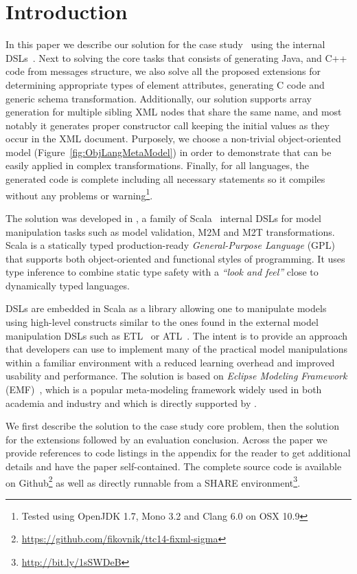 
\enlargethispage{20mm}

\section{Introduction}
\label{sec:Introduction}

In this paper we describe our solution for the \TTC \FIXML case study~\cite{Lano2014} using the \SIGMA internal DSLs~\cite{Krikava2014}.
Next to solving the core tasks that consists of generating Java, \Csharp and C++ code from \FIXML messages structure, we also solve all the proposed extensions for determining appropriate types of element attributes, generating C code and generic \FIXML schema transformation.
Additionally, our solution supports array generation for multiple sibling XML nodes that share the same name, and most notably it generates proper constructor call keeping the initial values as they occur in the XML document.
Purposely, we choose a non-trivial object-oriented model (\Cf Figure~\ref{fig:ObjLangMetaModel}) in order to demonstrate that \SIGMA can be easily applied in complex transformations.
Finally, for all languages, the generated code is complete including all necessary statements so it compiles without any problems or warning\footnote{Tested using OpenJDK 1.7, Mono 3.2 and Clang 6.0 on OSX 10.9}.

The solution was developed in \SIGMA, a family of Scala~\cite{Odersky2004} internal DSLs for model manipulation tasks such as model validation, M2M and M2T transformations.
Scala is a statically typed production-ready \emph{General-Purpose Language} (GPL) that supports both object-oriented and functional styles of programming.
It uses type inference to combine static type safety with a \emph{``look and feel''} close to dynamically typed languages.

\SIGMA DSLs are embedded in Scala as a library allowing one to manipulate models using high-level constructs similar to the ones found in the external model manipulation DSLs such as ETL~\cite{Kolovos2008a} or ATL~\cite{Jouault2006}.
The intent is to provide an approach that developers can use to implement many of the practical model manipulations within a familiar environment with a reduced learning overhead and improved usability and performance.
The solution is based on \emph{Eclipse Modeling Framework} (EMF)~\cite{EMF}, which is a popular meta-modeling framework widely used in both academia and industry and which is directly supported by \SIGMA.

We first describe the solution to the case study core problem, then the solution for the extensions followed by an evaluation conclusion.
Across the paper we provide references to code listings in the appendix for the reader to get additional details and have the paper self-contained.
The complete source code is available on Github\footnote{\url{https://github.com/fikovnik/ttc14-fixml-sigma}} as well as directly runnable from a SHARE environment\footnote{\url{http://bit.ly/1sSWDeB}}.